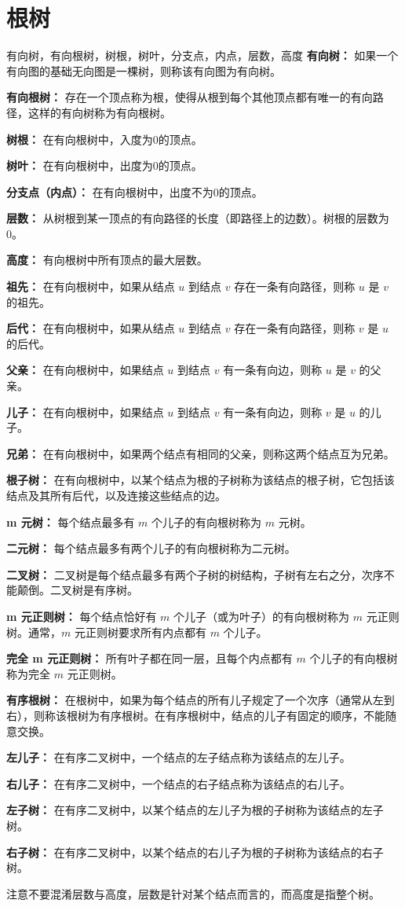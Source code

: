 \section{根树}
\begin{definition}{有向树，有向根树，树根，树叶，分支点，内点，层数，高度}{}
\textbf{有向树：} 如果一个有向图的基础无向图是一棵树，则称该有向图为有向树。

\textbf{有向根树：} 存在一个顶点称为根，使得从根到每个其他顶点都有唯一的有向路径，这样的有向树称为有向根树。

\textbf{树根：} 在有向根树中，入度为0的顶点。

\textbf{树叶：} 在有向根树中，出度为0的顶点。

\textbf{分支点（内点）：} 在有向根树中，出度不为0的顶点。

\textbf{层数：} 从树根到某一顶点的有向路径的长度（即路径上的边数）。树根的层数为0。

\textbf{高度：} 有向根树中所有顶点的最大层数。

\textbf{祖先：} 在有向根树中，如果从结点 $u$ 到结点 $v$ 存在一条有向路径，则称 $u$ 是 $v$ 的祖先。

\textbf{后代：} 在有向根树中，如果从结点 $u$ 到结点 $v$ 存在一条有向路径，则称 $v$ 是 $u$ 的后代。

\textbf{父亲：} 在有向根树中，如果结点 $u$ 到结点 $v$ 有一条有向边，则称 $u$ 是 $v$ 的父亲。

\textbf{儿子：} 在有向根树中，如果结点 $u$ 到结点 $v$ 有一条有向边，则称 $v$ 是 $u$ 的儿子。

\textbf{兄弟：} 在有向根树中，如果两个结点有相同的父亲，则称这两个结点互为兄弟。

\textbf{根子树：} 在有向根树中，以某个结点为根的子树称为该结点的根子树，它包括该结点及其所有后代，以及连接这些结点的边。

\textbf{m 元树：} 每个结点最多有 $m$ 个儿子的有向根树称为 $m$ 元树。

\textbf{二元树：} 每个结点最多有两个儿子的有向根树称为二元树。

\textbf{二叉树：} 二叉树是每个结点最多有两个子树的树结构，子树有左右之分，次序不能颠倒。二叉树是有序树。

\textbf{m 元正则树：} 每个结点恰好有 $m$ 个儿子（或为叶子）的有向根树称为 $m$ 元正则树。通常，$m$ 元正则树要求所有内点都有 $m$ 个儿子。

\textbf{完全 m 元正则树：} 所有叶子都在同一层，且每个内点都有 $m$ 个儿子的有向根树称为完全 $m$ 元正则树。

\textbf{有序根树：} 在根树中，如果为每个结点的所有儿子规定了一个次序（通常从左到右），则称该根树为有序根树。在有序根树中，结点的儿子有固定的顺序，不能随意交换。

\textbf{左儿子：} 在有序二叉树中，一个结点的左子结点称为该结点的左儿子。

\textbf{右儿子：} 在有序二叉树中，一个结点的右子结点称为该结点的右儿子。

\textbf{左子树：} 在有序二叉树中，以某个结点的左儿子为根的子树称为该结点的左子树。

\textbf{右子树：} 在有序二叉树中，以某个结点的右儿子为根的子树称为该结点的右子树。
\end{definition}
注意不要混淆层数与高度，层数是针对某个结点而言的，而高度是指整个树。

